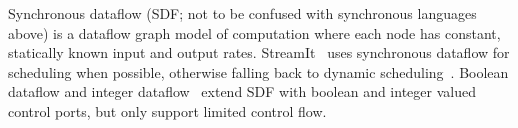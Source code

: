 Synchronous dataflow (SDF; not to be confused with synchronous languages above) is a dataflow graph model of computation where each node has constant, statically known input and output rates. StreamIt~\cite{thies2002streamit} uses synchronous dataflow for scheduling when possible, otherwise falling back to dynamic scheduling~\cite{soule2013dynamic}. Boolean dataflow and integer dataflow~\cite{buck1993scheduling,buck1994static} extend SDF with boolean and integer valued control ports, but only support limited control flow. 




% 


